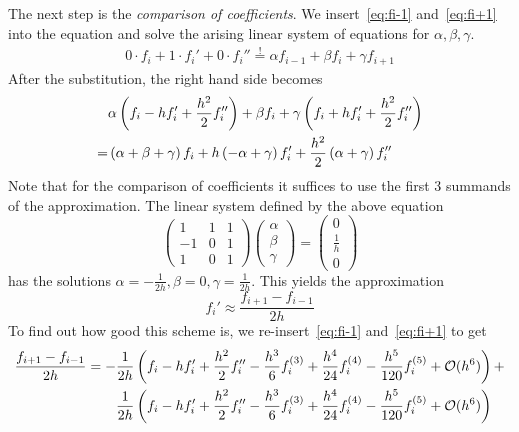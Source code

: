 The next step is the \textit{comparison of coefficients}. We insert~\eqref{eq:fi-1} and~\eqref{eq:fi+1}
into the equation and solve the arising linear system of equations for $\alpha,\beta,\gamma$.
\begin{align}
    0\cdot f_i + 1\cdot f_i' + 0\cdot f_i'' \overset{!}{=} \alpha f_{i-1} + \beta f_i + \gamma
    f_{i+1}
\end{align}
After the substitution, the right hand side becomes
\begin{align}
    &\alpha \left(f_i - hf_i' + \frac{h^2}{2}f_i''\right) + \beta f_i + \gamma\left(f_i + hf_i' + \frac{h^2}{2}f_i''\right)\notag\\
    = &\left(\alpha+\beta+\gamma\right)f_i + h\left(-\alpha+\gamma\right)f_i' + \frac{h^2}{2}\left(\alpha+\gamma\right)f_i''
\end{align} 
Note that for the comparison of coefficients it suffices to use the first 3 summands of the
approximation.\newpage\noindent
The linear system defined by the above equation
\begin{equation}
    \begin{pmatrix}
        1&1&1\\
        -1&0&1\\
        1&0&1
    \end{pmatrix}
    \begin{pmatrix}
        \alpha\\
        \beta\\
        \gamma
    \end{pmatrix}
    =
    \begin{pmatrix}
        0\\
        \frac{1}{h}\\
        0
    \end{pmatrix}
\end{equation}
has the solutions $\alpha = -\frac{1}{2h}, \beta = 0, \gamma = \frac{1}{2h}$.
This yields the approximation 
\begin{equation}
    f_i'\approx\frac{f_{i+1} - f_{i-1}}{2h}
\end{equation}
To find out how good this scheme is, we re-insert~\eqref{eq:fi-1} and~\eqref{eq:fi+1} to get
\begin{align}
    \frac{f_{i+1} - f_{i-1}}{2h}= -&\frac{1}{2h}\left(f_i - hf_i' + \frac{h^2}{2}f_i'' -
        \frac{h^3}{6}f_i^{(3)} + \frac{h^4}{24}f_i^{(4)} -
    \frac{h^5}{120}f_i^{(5)} + \mathcal{O}(h^6)\right) + \notag\\
                                   &\frac{1}{2h}\left(f_i - hf_i' + \frac{h^2}{2}f_i'' -
                                       \frac{h^3}{6}f_i^{(3)} + \frac{h^4}{24}f_i^{(4)} -
                                   \frac{h^5}{120}f_i^{(5)} + \mathcal{O}(h^6)\right)\notag
\end{align}
